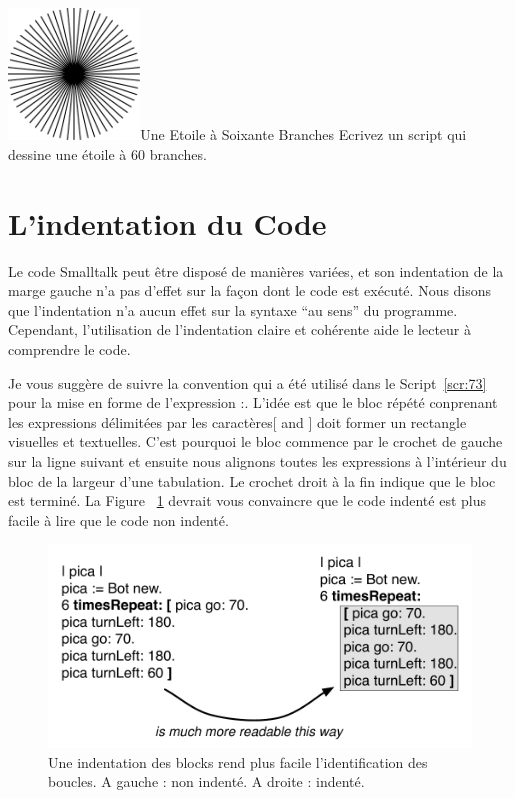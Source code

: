 \documentclass[a4paper,10pt,twoside]{book}
\begin{document}
\begin{exofigwithsizeandtitle}[0.65]{\includegraphics[width=3.5cm]{loopStar60}}{Une Etoile à Soixante Branches}\label{xp:71}
Ecrivez un script qui dessine une étoile à 60 branches. 
\end{exofigwithsizeandtitle}

\section{L’indentation du Code} 

Le code Smalltalk peut être disposé de manières variées, et son indentation de la marge 
gauche n'a pas d'effet sur la façon dont le code est exécuté. Nous disons que l'indentation 
n'a aucun effet sur la syntaxe ``au sens''  du programme. Cependant, l’utilisation de 
l'indentation claire et cohérente aide le lecteur à comprendre le code. 


Je vous suggère de suivre la convention qui a été utilisé dans le Script~\ref{scr:73} pour la mise 
en forme de l’expression  :. L'idée est que le bloc répété conprenant les expressions 
délimitées par les caractères[ and ] doit former un rectangle visuelles et textuelles. C'est 
pourquoi le bloc commence par le crochet de gauche sur la ligne suivant et 
ensuite nous alignons toutes les expressions à l'intérieur du bloc de la largeur d’une 
tabulation. Le crochet droit à la fin indique que le bloc est terminé. La Figure 
~\ref{fig:71} devrait vous convaincre que le code indenté est plus facile à lire que le code 
non indenté.

\begin{figure}[htbp]
	\centering
		\includegraphics[width=.9\linewidth]{indent}
	\caption{Une indentation des blocks rend plus facile l’identification des boucles. A gauche : 
	non indenté. A droite : indenté.}
	\label{fig:71}
\end{figure}
\end{document}
